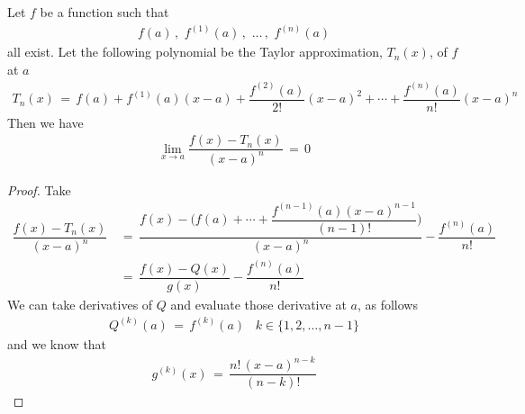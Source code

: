 \begin{theorem}
    \label{taylor_consequence_0}
    Let $f$ be a function such that 
    \begin{align*}
        f(a) \hspace{2pt} , \hspace{4pt} f^{(1)}(a) \hspace{2pt} , \hspace{4pt} \dots \hspace{2pt} , \hspace{4pt} f^{(n)}(a)
    \end{align*}
    all exist. Let the following polynomial be the Taylor approximation, $T_{n}(x)$, of $f$ at $a$
    \begin{align*}
        T_{n}(x) \hspace{2pt} = \hspace{2pt} f(a) + f^{(1)}(a)(x - a) + \dfrac{f^{(2)}(a)}{2!}(x - a)^{2} + \cdots + \dfrac{f^{(n)}(a)}{n!}(x - a)^{n}
    \end{align*}
    Then we have
    \begin{align*}
        \lim_{x \longrightarrow a} \dfrac{f(x) - T_{n}(x)}{(x - a)^{n}} \hspace{2pt} = \hspace{2pt} 0
    \end{align*}
    \begin{proof}
        Take
        \begin{align*}
            \dfrac{f(x) - T_{n}(x)}{(x - a)^{n}} \hspace{2pt} &= \hspace{2pt} \dfrac{f(x) - \Big(f(a) + \cdots + \dfrac{f^{(n-1)}(a) (x - a)^{n-1}}{(n - 1)!} \Big)}{(x - a)^{n}} - \dfrac{f^{(n)}(a)}{n!} \\[2ex]
            &= \hspace{2pt} \dfrac{f(x) - Q(x)}{g(x)} - \dfrac{f^{(n)}(a)}{n!} 
        \end{align*}
        We can take derivatives of $Q$ and evaluate those derivative at $a$, as follows
        \begin{align*}
            Q^{(k)}(a) \hspace{2pt} = \hspace{2pt} f^{(k)}(a) \hspace{10pt} k \in \{1, 2, \dots , n-1\}
        \end{align*}
        and we know that
        \begin{align*}
            g^{(k)}(x) \hspace{2pt} = \hspace{2pt} \dfrac{n! \hspace{2pt} (x - a)^{n - k}}{(n - k)!}

\end{align*}
\end{proof}
\end{theorem}
